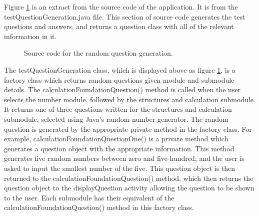 \documentclass{article}
\begin{document}
Figure \ref{figure:testQuestionGeneration} is an extract from the source code of the application. It is from the testQuestionGeneration.java file. This section of source code generates the test questions and answers, and returns a question class with all of the relevant information in it. 

\begin{figure}[H]
	\centering
	\caption{Source code for the random question generation.}
	\label{figure:testQuestionGeneration}
\end{figure}

The testQuestionGeneration class, which is displayed above as figure \ref{figure:testQuestionGeneration}, is a factory class which returns random questions given module and submodule details. The calculationFoundationQuestion() method is called when the user selects the number module, followed by the structures and calculation submodule. It returns one of three questions written for the structures and calculation submodule, selected using Java's random number generator. The random question is generated by the appropriate private method in the factory class. For example, calculationFoundationQuestionOne() is a private method which generates a question object with the appropriate information. This method generates five random numbers between zero and five-hundred, and the user is asked to input the smallest number of the five. This question object is then returned to the calculationFoundationQuestion() method, which then returns the question object to the displayQuestion activity allowing the question to be shown to the user. Each submodule has their equivalent of the calculationFoundationQuestion() method in this factory class. \par
\end{document}
